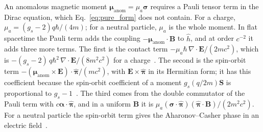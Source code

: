 \documentclass[aps,prd,onecolumn,tightenlines,nofootinbib,notitlepage,11pt,floatfix]{revtex4-2}
\theoremstyle{indentedtheorem}
\begin{document}
An anomalous magnetic moment $\boldsymbol{\mu}_\text{anom} = \mu_a\boldsymbol{\sigma}$ requires a Pauli tensor term in the Dirac equation, which Eq.~\eqref{eq:pure_form} does not contain. For a charge, $\mu_a=(g_s-2)q\hbar/(4m)$; for a neutral particle, $\mu_a$ is the whole moment. In flat spacetime the Pauli term adds the coupling $-\boldsymbol{\mu}_\text{anom}\cdot\mathbf{B}$ to $\hat{h}$, and at order $c^{-2}$ it adds three more terms. The first is the contact term $-\mu_a\hbar\,\nabla\cdot\mathbf{E}/(2mc^2)$, which is $-(g_s-2)\,q\hbar^2\,\nabla\cdot\mathbf{E}/(8m^2c^2)$ for a charge~\citep{Schwinger1948Quantumelect,Foldy1952Electromagnetic}. The second is the spin-orbit term $-(\boldsymbol{\mu}_\text{anom}\times\mathbf{E})\cdot\hat{\boldsymbol{\pi}}/(mc^2)$, with $\mathbf{E}\times\hat{\boldsymbol{\pi}}$ in its Hermitian form; it has this coefficient because the spin-orbit coefficient of a moment $g_s(q/2m)\mathbf{S}$ is proportional to $g_s-1$~\citep{Jackson1999Classical}. The third comes from the double commutator of the Pauli term with $c\boldsymbol{\alpha}\cdot\hat{\boldsymbol{\pi}}$, and in a uniform $\mathbf{B}$ it is $\mu_a(\boldsymbol{\sigma}\cdot\hat{\boldsymbol{\pi}})(\hat{\boldsymbol{\pi}}\cdot\mathbf{B})/(2m^2c^2)$. For a neutral particle the spin-orbit term gives the Aharonov--Casher phase in an electric field~\citep{AharonovCasher1984Topological,Cimmino1989Observation}.
\end{document}
